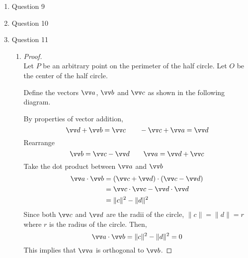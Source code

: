 \documentclass[11pt]{article}
\newcommand{\norm}[1]{\lVert #1 \rVert}
\begin{document}
\begin{enumerate}
    \item Question 9
    
    \item Question 10
    
    \item Question 11
    
    \begin{enumerate}
        \item 
        \begin{proof}
            \hfill \\
            Let $P$ be an arbitrary point on the perimeter of the half circle. Let $O$ be the center of the half circle.
            
            Define the vectors $\vv a$, $\vv b$ and $\vv c$ as shown in the following diagram.
            
            \begin{center}
            \end{center}
            By properties of vector addition,
            $$
            \vv d + \vv b = \vv c \qquad -\vv c + \vv a = \vv d
            $$
            Rearrange
            $$
            \vv b = \vv c - \vv d \qquad \vv a = \vv d + \vv c
            $$
            Take the dot product between $\vv a$ and $\vv b$
            \begin{align*}
                \vv a \cdot \vv b &= (\vv c + \vv d) \cdot (\vv c - \vv d) \\
                &= \vv c \cdot \vv c - \vv d \cdot \vv d \\
                &= \norm{c}^2 - \norm{d}^2
            \end{align*}
            Since both $\vv c$ and $\vv d$ are the radii of the circle, $\norm{c}=\norm{d}=r$ where $r$ is the radius of the circle. Then,
            $$
            \vv a \cdot \vv b = \norm{c}^2 - \norm{d}^2 = 0
            $$
            This implies that $\vv a$ is orthogonal to $\vv b$.
        \end{proof}
        

\end{enumerate}
\end{enumerate}
\end{document}
